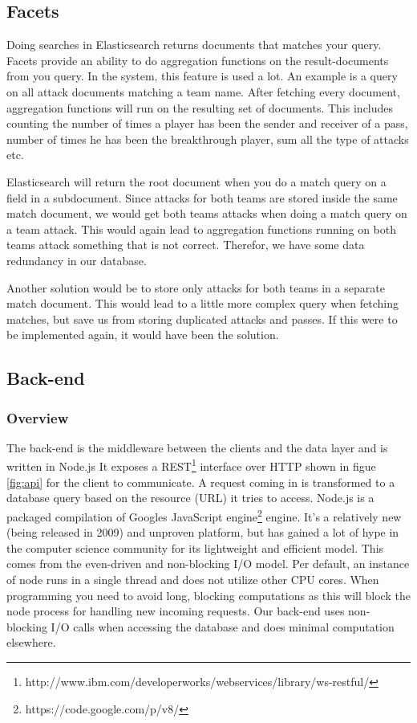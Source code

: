 \subsection{Facets}
\label{sec:facets}
Doing searches in Elasticsearch returns documents that matches your query. Facets provide an ability to do aggregation functions on the result-documents from you query. In the system, this feature is used a lot. An example is a query on all attack documents matching a team name. After fetching every document, aggregation functions will run on the resulting set of documents. This includes counting the number of times a player has been the sender and receiver of a pass, number of times he has been the breakthrough player, sum all the type of attacks etc. 

Elasticsearch will return the root document when you do a match query on a field in a subdocument. Since attacks for both teams are stored inside the same match document, we would get both teams attacks when doing a match query on a team attack. This would again lead to aggregation functions running on both teams attack something that is not correct. Therefor, we have some data redundancy in our database.

Another solution would be to store only attacks for both teams in a separate match document. This would lead to a little more complex query when fetching matches, but save us from storing duplicated attacks and passes. If this were to be implemented again, it would have been the solution.


\subsection{Back-end}

\subsubsection{Overview}	
The back-end is the middleware between the clients and the data layer and is written in Node.js\cite{node.js} It exposes a \ac{REST}\footnote{http://www.ibm.com/developerworks/webservices/library/ws-restful/} interface over \ac{HTTP} shown in figue \ref{fig:api} for the client to communicate. A request coming in is transformed to a database query based on the resource (URL) it tries to access. Node.js is a packaged compilation of Googles JavaScript engine\footnote{https://code.google.com/p/v8/} engine. It’s a relatively new (being released in 2009) and unproven platform, but has gained a lot of hype in the computer science community for its lightweight and efficient model. This comes from the even-driven and non-blocking I/O model. Per default, an instance of node runs in a single thread and does not utilize other CPU cores. When programming you need to avoid long, blocking computations as this will block the node process for handling new incoming requests. Our back-end uses non-blocking I/O calls when accessing the database and does minimal computation elsewhere. 

